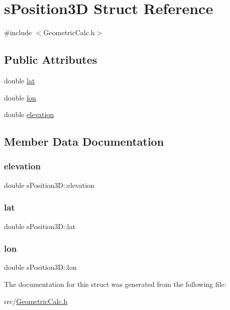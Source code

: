 \hypertarget{structs_position3_d}{}\section{s\+Position3D Struct Reference}
\label{structs_position3_d}


{\ttfamily \#include $<$Geometric\+Calc.\+h$>$}

\subsection*{Public Attributes}
\begin{DoxyCompactItemize}
\item 
double \hyperlink{structs_position3_d_a0e4b0c9062c6078595bc52f7f44b6ab5}{lat}
\item 
double \hyperlink{structs_position3_d_a20077e90edce2375772932e068c47118}{lon}
\item 
double \hyperlink{structs_position3_d_a5cc5aa32a6588b19d7666007525c6e9d}{elevation}
\end{DoxyCompactItemize}


\subsection{Member Data Documentation}
\mbox{\label{structs_position3_d_a5cc5aa32a6588b19d7666007525c6e9d}} 
\subsubsection{\texorpdfstring{elevation}{elevation}}
{\footnotesize\ttfamily double s\+Position3\+D\+::elevation}

\mbox{\label{structs_position3_d_a0e4b0c9062c6078595bc52f7f44b6ab5}} 
\subsubsection{\texorpdfstring{lat}{lat}}
{\footnotesize\ttfamily double s\+Position3\+D\+::lat}

\mbox{\label{structs_position3_d_a20077e90edce2375772932e068c47118}} 
\subsubsection{\texorpdfstring{lon}{lon}}
{\footnotesize\ttfamily double s\+Position3\+D\+::lon}



The documentation for this struct was generated from the following file\+:\begin{DoxyCompactItemize}
\item 
src/\hyperlink{_geometric_calc_8h}{Geometric\+Calc.\+h}\end{DoxyCompactItemize}
